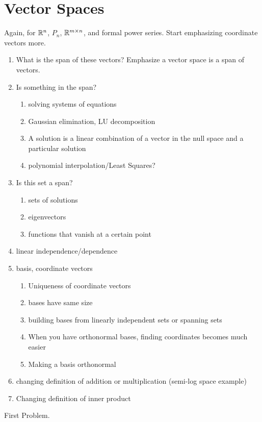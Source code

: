 \chapter{Vector Spaces}

Again, for $\mathbb{R}^n$, $P_n$, $\mathbb{R}^{m\times n}$, and formal power
series. Start emphasizing coordinate vectors more.
\begin{enumerate}
\item What is the span of these vectors?  Emphasize a vector space is
  a span of vectors.

\item Is something in the span?
  \begin{enumerate}
  \item solving systems of equations
  \item Gaussian elimination, LU decomposition
  \item A solution is a linear combination of a vector in the null
    space and a particular solution
  \item polynomial interpolation/Least Squares?
  \end{enumerate}

\item Is this set a span?
  \begin{enumerate}
  \item sets of solutions
  \item eigenvectors
  \item functions that vanish at a certain point
  \end{enumerate}

\item linear independence/dependence

\item basis, coordinate vectors
  \begin{enumerate}
  \item Uniqueness of coordinate vectors
  \item bases have same size
  \item building bases from linearly independent sets or spanning sets
  \item When you have orthonormal bases, finding coordinates becomes
    much easier
  \item Making a basis orthonormal
  \end{enumerate}

\item changing definition of addition or multiplication (semi-log
  space example)
\item Changing definition of inner product

\end{enumerate}

\begin{problem}
  First Problem.
\end{problem}


